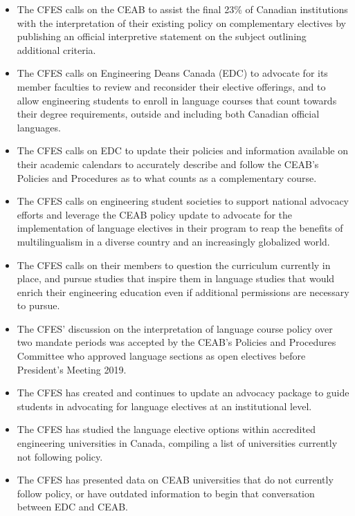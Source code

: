 \begin{itemize}
 \item The CFES calls on the CEAB to assist the final 23\% of Canadian institutions with the interpretation of their existing policy on complementary electives by publishing an official interpretive statement on the subject outlining additional criteria.
 \item The CFES calls on Engineering Deans Canada (EDC) to advocate for its member faculties to review and reconsider their elective offerings, and to allow engineering students to enroll in language courses that count towards their degree requirements, outside and including both Canadian official languages.
 \item The CFES calls on EDC to update their policies and information available on their academic calendars to accurately describe and follow the CEAB's Policies and Procedures as to what counts as a complementary course.
 \item The CFES calls on engineering student societies to support national advocacy efforts and leverage the CEAB policy update to advocate for the implementation of language electives in their program to reap the benefits of multilingualism in a diverse country and an increasingly globalized world.
 \item The CFES calls on their members to question the curriculum currently in place, and pursue studies that inspire them in language studies that would enrich their engineering education even if additional permissions are necessary to pursue.
\end{itemize}

\begin{itemize}
 \item The CFES' discussion on the interpretation of language course policy over two mandate periods was accepted by the CEAB's Policies and Procedures Committee who approved language sections as open electives before President's Meeting 2019.
 \item The CFES has created and continues to update an advocacy package to guide students in advocating for language electives at an institutional level.
 \item The CFES has studied the language elective options within accredited engineering universities in Canada, compiling a list of universities currently not following policy.
 \item The CFES has presented data on CEAB universities that do not currently follow policy, or have outdated information to begin that conversation between EDC and CEAB.
\end{itemize}


